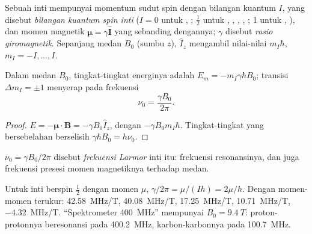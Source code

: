 \begin{definition}\label{def:b3:advanced-nmr:nuclear-spin}
Sebuah inti mempunyai momentum sudut spin dengan bilangan kuantum $I$, yang
disebut \emph{bilangan kuantum spin inti}
($I = 0$ untuk , ; $\frac12$ untuk , ,
, , ; 1 untuk , ), dan momen
magnetik $\boldsymbol\mu = \gamma\hat{\mathbf
I}$ yang sebanding dengannya; $\gamma$ disebut \emph{rasio
giromagnetik}. Sepanjang medan $B_0$ (sumbu $z$),
$\hat I_z$ mengambil nilai-nilai $m_I\hbar$, $m_I = -I, \dots, I$.
\end{definition}

\begin{proposition}\label{prop:b3:advanced-nmr:zeeman}
Dalam medan $B_0$, tingkat-tingkat energinya adalah $E_m = -m_I\gamma\hbar B_0$;
transisi $\Delta m_I = \pm1$ menyerap pada frekuensi
\[
\nu_0 = \frac{\gamma B_0}{2\pi}.
\]
\end{proposition}

\begin{proof}
$E = -\boldsymbol\mu\cdot\mathbf B = -\gamma B_0\hat I_z$, dengan 
$-\gamma B_0m_I\hbar$. Tingkat-tingkat yang bersebelahan berselisih
$\gamma\hbar B_0 = h\nu_0$.
\end{proof}

\begin{definition}\label{def:b3:advanced-nmr:larmor}
$\nu_0 = \gamma B_0/2\pi$ disebut \emph{frekuensi Larmor}
inti itu: frekuensi resonansinya, dan juga frekuensi presesi momen
magnetiknya terhadap medan.
\end{definition}

\begin{example}\label{ex:b3:advanced-nmr:nuclei}
Untuk inti berspin $\frac12$ dengan momen $\mu$, $\gamma/2\pi = \mu/(Ih) = 2\mu/h$.
Dengan momen-momen terukur:  \qty{42.58}{MHz/T}, 
\qty{40.08}{MHz/T},  \qty{17.25}{MHz/T}, 
\qty{10.71}{MHz/T},  \qty{-4.32}{MHz/T}. ``Spektrometer
\qty{400}{MHz}'' mempunyai $B_0 = \qty{9.4}{T}$: proton-protonnya beresonansi
pada \qty{400.2}{MHz}, karbon-karbonnya pada \qty{100.7}{MHz}.
\end{example}

